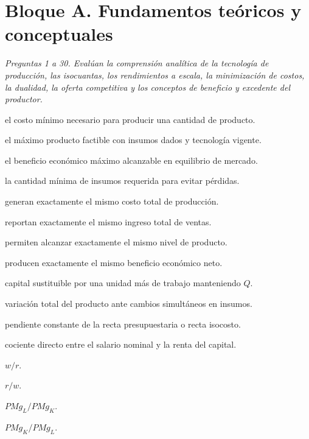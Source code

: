 \section*{Bloque A. Fundamentos teóricos y conceptuales}

\noindent\textit{Preguntas 1 a 30. Evalúan la comprensión analítica de la tecnología de producción, las isocuantas, los rendimientos a escala, la minimización de costos, la dualidad, la oferta competitiva y los conceptos de beneficio y excedente del productor.}

\begin{opts}
    \item el costo mínimo necesario para producir una cantidad de producto.
    \item el máximo producto factible con insumos dados y tecnología vigente.
    \item el beneficio económico máximo alcanzable en equilibrio de mercado.
    \item la cantidad mínima de insumos requerida para evitar pérdidas.
\end{opts}

\begin{opts}
    \item generan exactamente el mismo costo total de producción.
    \item reportan exactamente el mismo ingreso total de ventas.
    \item permiten alcanzar exactamente el mismo nivel de producto.
    \item producen exactamente el mismo beneficio económico neto.
\end{opts}

\begin{opts}
    \item capital sustituible por una unidad más de trabajo manteniendo $Q$.
    \item variación total del producto ante cambios simultáneos en insumos.
    \item pendiente constante de la recta presupuestaria o recta isocosto.
    \item cociente directo entre el salario nominal y la renta del capital.
\end{opts}

\begin{opts}
    \item $w/r$.
    \item $r/w$.
    \item $PMg_L/PMg_K$.
    \item $PMg_K/PMg_L$.
\end{opts}

